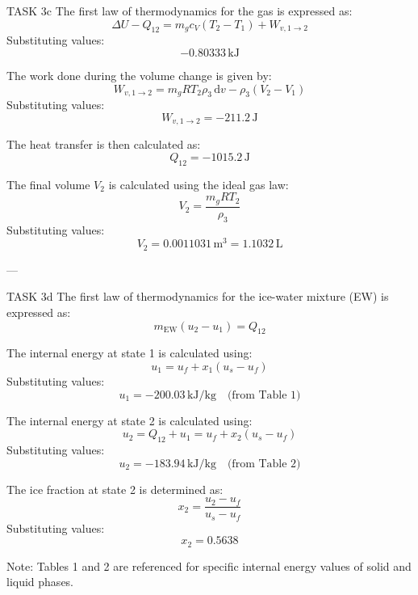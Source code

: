 TASK 3c  
The first law of thermodynamics for the gas is expressed as:  
\[
\Delta U - Q_{12} = m_g c_V (T_2 - T_1) + W_{v,1 \to 2}
\]  
Substituting values:  
\[
-0.80333 \, \text{kJ}
\]  

The work done during the volume change is given by:  
\[
W_{v,1 \to 2} = m_g R T_2 \rho_3 \, \text{d}v - \rho_3 (V_2 - V_1)
\]  
Substituting values:  
\[
W_{v,1 \to 2} = -211.2 \, \text{J}
\]  

The heat transfer is then calculated as:  
\[
Q_{12} = -1015.2 \, \text{J}
\]  

The final volume \( V_2 \) is calculated using the ideal gas law:  
\[
V_2 = \frac{m_g R T_2}{\rho_3}
\]  
Substituting values:  
\[
V_2 = 0.0011031 \, \text{m}^3 = 1.1032 \, \text{L}
\]  

---

TASK 3d  
The first law of thermodynamics for the ice-water mixture (EW) is expressed as:  
\[
m_{\text{EW}} (u_2 - u_1) = Q_{12}
\]  

The internal energy at state 1 is calculated using:  
\[
u_1 = u_f + x_1 (u_s - u_f)
\]  
Substituting values:  
\[
u_1 = -200.03 \, \text{kJ/kg} \quad \text{(from Table 1)}
\]  

The internal energy at state 2 is calculated using:  
\[
u_2 = Q_{12} + u_1 = u_f + x_2 (u_s - u_f)
\]  
Substituting values:  
\[
u_2 = -183.94 \, \text{kJ/kg} \quad \text{(from Table 2)}
\]  

The ice fraction at state 2 is determined as:  
\[
x_2 = \frac{u_2 - u_f}{u_s - u_f}
\]  
Substituting values:  
\[
x_2 = 0.5638
\]  

Note: Tables 1 and 2 are referenced for specific internal energy values of solid and liquid phases.